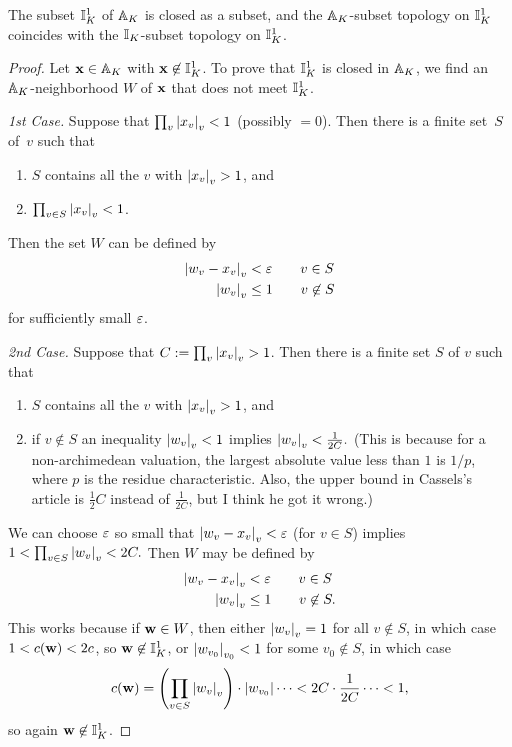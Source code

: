 \begin{lemma}
The subset $\II_K^1$ of $\AA_K$ is closed as a subset,
and the $\AA_K$-subset topology on $\II_K^1$ coincides
with the $\II_K$-subset topology on $\II_K^1$.
\end{lemma}
\begin{proof}
  Let $\bx\in\AA_K$ with $\bx\not\in\II_K^1$. To prove that $\II_K^1$
  is closed in $\AA_K$, we find an $\AA_K$-neighborhood $W$ of $\bx$
  that does not meet $\II_K^1$.

{\em 1st Case.}  Suppose that $\prod_v \abs{x_v}_v<1$ (possibly $=0$).
Then there is a finite set~$S$ of~$v$ such that
\begin{enumerate}
\item $S$ contains all the $v$ with $\abs{x_v}_v>1$, and
\item $\prod_{v\in S}\abs{x_v}_v < 1$.
\end{enumerate}
Then the set $W$ can be
defined by 
\begin{align*}
  \abs{w_v - x_v}_v &< \eps \qquad v\in S\\
  \abs{w_v}_v &\leq 1 \qquad v\not\in S
\end{align*}
for sufficiently small $\eps$.

{\em 2nd Case.} Suppose that $C:=\prod_v \abs{x_v}_v>1$.
Then there is a finite set $S$ of $v$ such that
\begin{enumerate}
\item $S$ contains all the $v$ with $\abs{x_v}_v>1$, and
\item if $v\not\in S$ an inequality 
$\abs{w_v}_v<1$ implies $\abs{w_v}_v < \frac{1}{2C}.$
(This is because for a non-archimedean valuation, the
largest absolute value less than $1$ is $1/p$, where $p$ is
the residue characteristic.  Also, the upper bound in
Cassels's article is $\frac{1}{2}C$ instead of $\frac{1}{2C}$,
but I think he got it wrong.)
\end{enumerate}
We can choose $\eps$ so small that 
$\abs{w_v-x_v}_v<\eps$ (for $v\in S$) implies
$1<\prod_{v\in S} \abs{w_v}_v < 2C.$  Then $W$ may be defined
by 
\begin{align*}
  \abs{w_v - x_v}_v &< \eps \qquad v\in S\\
  \abs{w_v}_v &\leq 1 \qquad v\not\in S.
\end{align*}
This works because if $\bw\in W$, then either
$\abs{w_v}_v=1$ for all $v\not\in S$, in 
which case $1 < c(\bw)  < 2c$, so $\bw\not\in \II_K^1$,
or $\abs{w_{v_0}}_{v_0}<1$ for some $v_0\not\in S$, in
which case $$c(\bw) = \left(\prod_{v\in S} \abs{w_v}_v \right)\cdot 
\abs{w_{v_0}} \cdots < 2C \cdot \frac{1}{2C} \cdots < 1,$$
so again $\bw\not\in\II_K^1$.


\end{proof}
